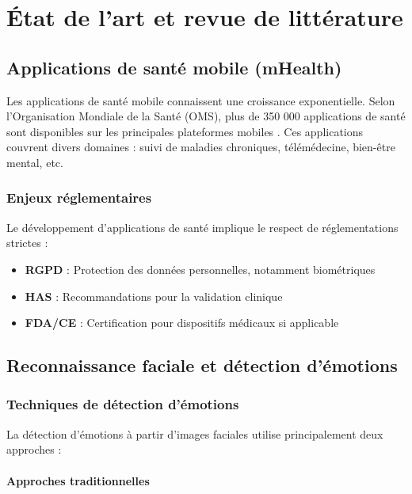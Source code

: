 \documentclass[a4paper,11pt]{report}
\begin{document}
\chapter{État de l'art et revue de littérature}

\section{Applications de santé mobile (mHealth)}

Les applications de santé mobile connaissent une croissance exponentielle. Selon l'Organisation Mondiale de la Santé (OMS), plus de 350 000 applications de santé sont disponibles sur les principales plateformes mobiles \cite{who_mhealth}. Ces applications couvrent divers domaines : suivi de maladies chroniques, télémédecine, bien-être mental, etc.

\subsection{Enjeux réglementaires}

Le développement d'applications de santé implique le respect de réglementations strictes :

\begin{itemize}
    \item \textbf{RGPD} : Protection des données personnelles, notamment biométriques
    \item \textbf{HAS} : Recommandations pour la validation clinique
    \item \textbf{FDA/CE} : Certification pour dispositifs médicaux si applicable
\end{itemize}

\section{Reconnaissance faciale et détection d'émotions}

\subsection{Techniques de détection d'émotions}

La détection d'émotions à partir d'images faciales utilise principalement deux approches :

\subsubsection{Approches traditionnelles}
\end{document}
